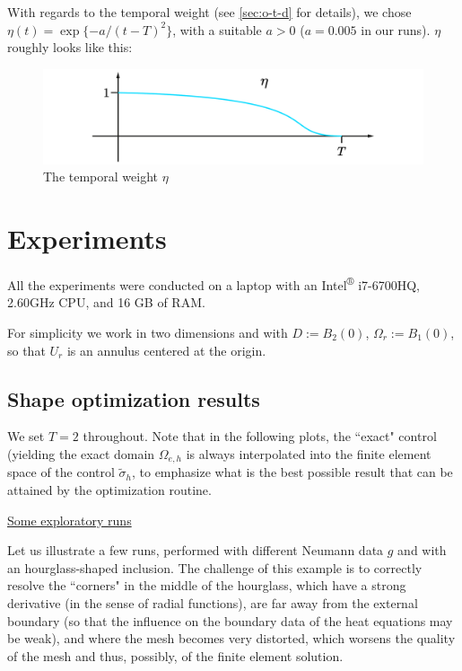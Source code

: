 \documentclass[english,a4paper,10pt,oneside]{scrbook}	%
\theoremstyle{break}
\theoremstyle{remark}
\begin{document}
With regards to the temporal weight (see \cref{sec:o-t-d} for details), we chose $\eta(t) = \exp\{-a/(t-T)^2\}$, with a suitable $a>0$ ($a=0.005$ in our runs). $\eta$ roughly looks like this:

\begin{figure}[H]
\centering
\includegraphics[width=0.5\columnwidth]{Images/Eta.pdf}
\caption{The temporal weight $\eta$}\label{fig:eta}
\end{figure}

\section{Experiments}
\label{sec:experiments}

All the experiments were conducted on a laptop with an Intel\textsuperscript{®} i7-6700HQ, 2.60GHz CPU, and 16 GB of RAM.

For simplicity we work in two dimensions and with $D:=B_2(0)$, $\Omega_r := B_{1}(0)$, so that $U_r$ is an annulus centered at the origin. 

\subsection{Shape optimization results}

We set $T=2$ throughout. Note that in the following plots, the ``exact" control (yielding the exact domain $\Omega_{e,h}$ is always interpolated into the finite element space of the control $\tilde{\sigma}_h$, to emphasize what is the best possible result that can be attained by the optimization routine.
%

\underline{Some exploratory runs}

Let us illustrate a few runs, performed with different Neumann data $g$ and with an hourglass-shaped inclusion. The challenge of this example is to correctly resolve the ``corners" in the middle of the hourglass, which have a strong derivative (in the sense of radial functions), are far away from the external boundary (so that the influence on the boundary data of the heat equations may be weak), and where the mesh becomes very distorted, which worsens the quality of the mesh and thus, possibly, of the finite element solution.
\end{document}
